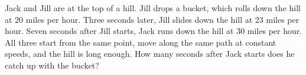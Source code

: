 Jack and Jill are at the top of a hill. Jill drops a bucket, which rolls down the hill at $20$ miles per hour. Three seconds later, Jill slides down the hill at $23$ miles per hour. Seven seconds after Jill starts, Jack runs down the hill at $30$ miles per hour. All three start from the same point, move along the same path at constant speeds, and the hill is long enough. How many seconds after Jack starts does he catch up with the bucket?
